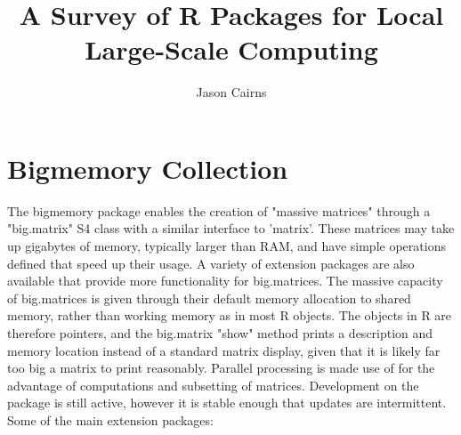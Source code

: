 \documentclass[10pt,a4paper]{article}
\begin{document}
\title{A Survey of R Packages for Local Large-Scale Computing}
\author{Jason Cairns}
  
\maketitle{}
\tableofcontents{}

\section{Bigmemory Collection}
\label{sec:bigmemory-collection}

The bigmemory package enables the creation of "massive matrices"
through a "big.matrix" S4 class with a similar interface to
'matrix'\cite{kane13:bigmemory}. These matrices may take up gigabytes
of memory, typically larger than RAM, and have simple operations
defined that speed up their usage. A variety of extension packages are
also available that provide more functionality for big.matrices. The
massive capacity of big.matrices is given through their default memory
allocation to shared memory, rather than working memory as in most R
objects. The objects in R are therefore pointers, and the big.matrix
"show" method prints a description and memory location instead of a
standard matrix display, given that it is likely far too big a matrix
to print reasonably. Parallel processing is made use of for the
advantage of computations and subsetting of matrices. Development on
the package is still active, however it is stable enough that updates
are intermittent. Some of the main extension packages:
\end{document}
